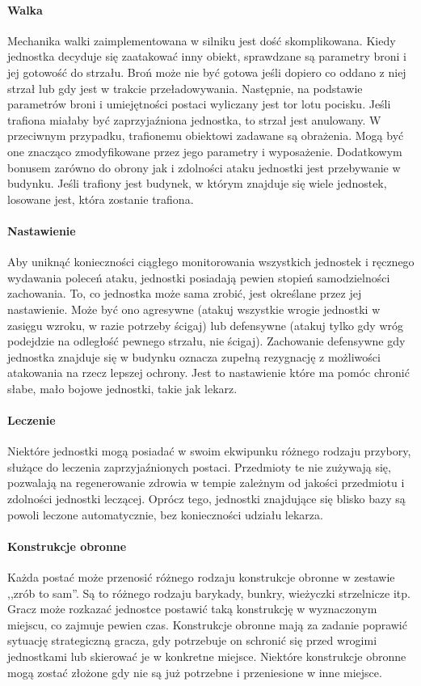 \documentclass[licencjacka]{pracamgr}
\begin{document}
    \paragraph{Walka}
      Mechanika walki zaimplementowana w silniku jest dość skomplikowana. Kiedy jednostka decyduje się zaatakować inny obiekt,
      sprawdzane są parametry broni i jej gotowość do strzału. Broń może nie być gotowa jeśli dopiero co oddano z niej strzał lub gdy
      jest w trakcie przeładowywania. Następnie, na podstawie parametrów broni i umiejętności postaci wyliczany jest tor lotu pocisku.
      Jeśli trafiona miałaby być zaprzyjaźniona jednostka, to strzał jest anulowany. W przeciwnym przypadku, trafionemu obiektowi zadawane są
      obrażenia. Mogą być one znacząco zmodyfikowane przez jego parametry i wyposażenie. Dodatkowym bonusem zarówno do obrony jak i zdolności
      ataku jednostki jest przebywanie w budynku. Jeśli trafiony jest budynek, w którym znajduje się wiele jednostek, losowane jest, która
      zostanie trafiona.
    \paragraph{Nastawienie}
      Aby uniknąć konieczności ciągłego monitorowania wszystkich jednostek i ręcznego wydawania poleceń ataku, jednostki posiadają pewien
      stopień samodzielności zachowania. To, co jednostka może sama zrobić, jest określane przez jej nastawienie. Może być ono agresywne
      (atakuj wszystkie wrogie jednostki w zasięgu wzroku, w razie potrzeby ścigaj) lub defensywne (atakuj tylko gdy wróg podejdzie na
      odległość pewnego strzału, nie ścigaj). Zachowanie defensywne gdy jednostka znajduje się w budynku oznacza zupełną rezygnację z
      możliwości atakowania na rzecz lepszej ochrony. Jest to nastawienie które ma pomóc chronić słabe, mało bojowe jednostki, takie jak lekarz.
    \paragraph{Leczenie}
      Niektóre jednostki mogą posiadać w swoim ekwipunku różnego rodzaju przybory, służące do leczenia zaprzyjaźnionych postaci.
      Przedmioty te nie zużywają się, pozwalają na regenerowanie zdrowia w tempie zależnym od jakości przedmiotu i zdolności jednostki leczącej.
      Oprócz tego, jednostki znajdujące się blisko bazy są powoli leczone automatycznie, bez konieczności udziału lekarza.
    \paragraph{Konstrukcje obronne}
      Każda postać może przenosić różnego rodzaju konstrukcje obronne w zestawie ,,zrób to sam''. Są to różnego rodzaju barykady, bunkry, wieżyczki
      strzelnicze itp. Gracz może rozkazać jednostce postawić taką konstrukcję w wyznaczonym miejscu, co zajmuje pewien czas.
      Konstrukcje obronne mają za zadanie poprawić sytuację strategiczną gracza, gdy potrzebuje on schronić się przed wrogimi jednostkami lub
      skierować je w konkretne miejsce. Niektóre konstrukcje obronne mogą zostać złożone gdy nie są już potrzebne i przeniesione w inne miejsce.
\end{document}
